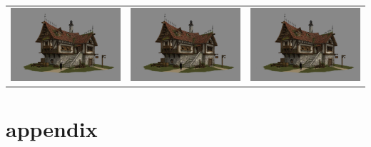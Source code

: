 \documentclass[12pt]{article}
\begin{document}
\begin{tabular}{lcr}
    \includegraphics[scale = 0.3]{donghee-han-d2.jpg} & \includegraphics[scale = 0.3]{donghee-han-d2.jpg} & \includegraphics[scale = 0.3]{donghee-han-d2.jpg} \\[0.4cm]
\end{tabular}

\appendix

\section{appendix}
\end{document}
